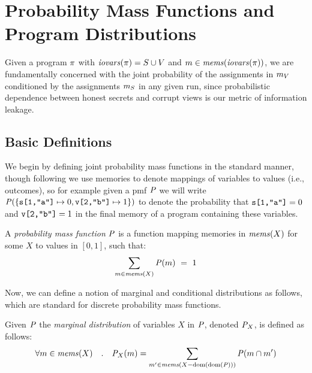 \section{Probability Mass Functions and Program Distributions}
\label{section-pmf}

Given a program $\pi$ with $\mathit{iovars}(\pi) = S \cup V$ and $m \in
\mathit{mems}(\mathit{iovars}(\pi))$, we are fundamentally concerned with the joint
probability of the assignments in $m_V$ conditioned by the
assignments $m_S$ in any given run, since probabilistic
dependence between honest secrets and corrupt views is our metric of
information leakage.

\subsection{Basic Definitions} 

We begin by defining joint probability mass functions in the standard
manner, though following \cite{barthe2019probabilistic} we use
memories to denote mappings of variables to values (i.e., outcomes),
so for example given a pmf $\mathit{P}$ we will write $\mathit{P}(\{ \texttt{s[1,"a"]}
\mapsto 0, \texttt{v[2,"b"]} \mapsto 1 \})$ to denote the probability that
$\texttt{s[1,"a"]} = 0$ and $\texttt{v[2,"b"]} = 1$ in the final memory of a
program containing these variables.
\begin{definition}
  A \emph{probability mass function} $\mathit{P}$ is a function
  mapping memories in $\mathit{mems}(X)$ for some $X$ to values in $[0,1]$, such that:
  $$
  \sum_{m \in \mathit{mems}(X)} \mathit{P}(m) \  = \ 1
  $$
\end{definition}
Now, we can define a notion of marginal and conditional
distributions as follows, which are standard for discrete
probability mass functions. 
\begin{definition}
  Given $\mathit{P}$ the \emph{marginal distribution} of variables $X$
  in $\mathit{P}$, denoted ${\mathit{P}}_{X}$, is defined as follows:
  $$
  \forall m \in \mathit{mems}(X) \quad . \quad {\mathit{P}}_{X}(m) =
  \sum_{m' \in \mathit{mems}(X-\mathrm{dom}(\mathrm{dom}(\mathit{P})))} \mathit{P}(m \cap m')
  $$
\end{definition}

